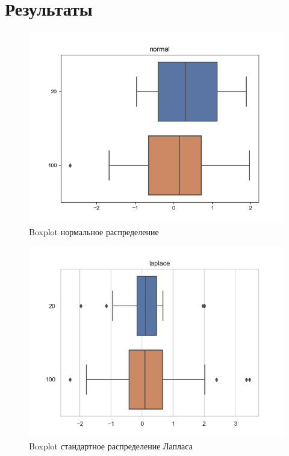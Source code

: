 \documentclass[a4]{article}
\begin{document}
\section{Результаты}
\begin{center}

\begin{figure}[H]
\caption{Boxplot нормальное распределение }
\includegraphics[width=\textwidth]{normal.png}
\end{figure}

\begin{figure}[H]
\caption{Boxplot стандартное распределение Лапласа }
\includegraphics[width=\textwidth]{laplace.png} 
\end{figure}


\end{center}
\end{document}
